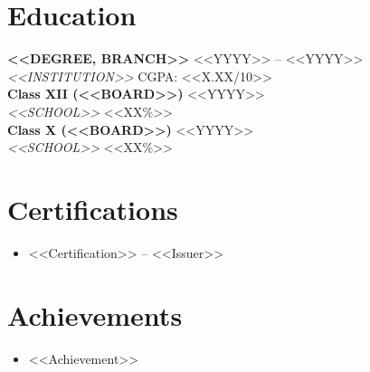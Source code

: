 \documentclass[10pt,a4paper]{article}
\begin{document}
\section*{Education}
\textbf{<<DEGREE, BRANCH>>} \hfill <<YYYY>> -- <<YYYY>> \\
\textit{<<INSTITUTION>>} \hfill CGPA: <<X.XX/10>> \\[2pt]
\textbf{Class XII (<<BOARD>>)} \hfill <<YYYY>> \\
\textit{<<SCHOOL>>} \hfill <<XX\%>> \\[2pt]
\textbf{Class X (<<BOARD>>)} \hfill <<YYYY>> \\
\textit{<<SCHOOL>>} \hfill <<XX\%>>

\section*{Certifications}
\begin{itemize}
    \item <<Certification>> -- <<Issuer>>
\end{itemize}

\section*{Achievements}
\begin{itemize}
    \item <<Achievement>>
\end{itemize}
\end{document}
